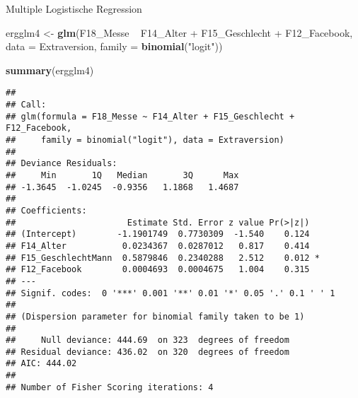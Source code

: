 \documentclass[ignorenonframetext,]{beamer}
\newenvironment{Shaded}{\begin{snugshade}}{\end{snugshade}}
\newcommand{\KeywordTok}[1]{\textcolor[rgb]{0.13,0.29,0.53}{\textbf{{#1}}}}
\newcommand{\DataTypeTok}[1]{\textcolor[rgb]{0.13,0.29,0.53}{{#1}}}
\newcommand{\StringTok}[1]{\textcolor[rgb]{0.31,0.60,0.02}{{#1}}}
\newcommand{\NormalTok}[1]{{#1}}
\begin{document}
\begin{frame}[fragile]{Multiple Logistische Regression}

\begin{Shaded}
\begin{Highlighting}[]
\NormalTok{ergglm4 <-}\StringTok{ }\KeywordTok{glm}\NormalTok{(F18_Messe ~}\StringTok{ }\NormalTok{F14_Alter }
               \NormalTok{+}\StringTok{ }\NormalTok{F15_Geschlecht}
               \NormalTok{+}\StringTok{ }\NormalTok{F12_Facebook,}
              \DataTypeTok{data =} \NormalTok{Extraversion,}
              \DataTypeTok{family =} \KeywordTok{binomial}\NormalTok{(}\StringTok{"logit"}\NormalTok{))}
              
\KeywordTok{summary}\NormalTok{(ergglm4)}
\end{Highlighting}
\end{Shaded}

\begin{verbatim}
## 
## Call:
## glm(formula = F18_Messe ~ F14_Alter + F15_Geschlecht + F12_Facebook, 
##     family = binomial("logit"), data = Extraversion)
## 
## Deviance Residuals: 
##     Min       1Q   Median       3Q      Max  
## -1.3645  -1.0245  -0.9356   1.1868   1.4687  
## 
## Coefficients:
##                      Estimate Std. Error z value Pr(>|z|)  
## (Intercept)        -1.1901749  0.7730309  -1.540    0.124  
## F14_Alter           0.0234367  0.0287012   0.817    0.414  
## F15_GeschlechtMann  0.5879846  0.2340288   2.512    0.012 *
## F12_Facebook        0.0004693  0.0004675   1.004    0.315  
## ---
## Signif. codes:  0 '***' 0.001 '**' 0.01 '*' 0.05 '.' 0.1 ' ' 1
## 
## (Dispersion parameter for binomial family taken to be 1)
## 
##     Null deviance: 444.69  on 323  degrees of freedom
## Residual deviance: 436.02  on 320  degrees of freedom
## AIC: 444.02
## 
## Number of Fisher Scoring iterations: 4
\end{verbatim}

\end{frame}
\end{document}

